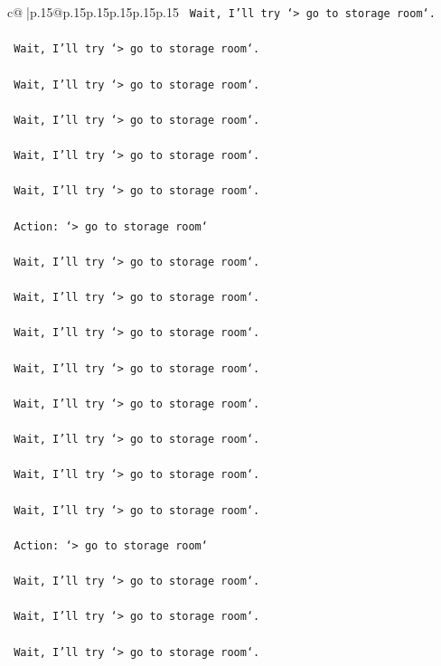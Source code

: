 \documentclass{article}
\begin{document}
{\begin{supertabular}{c@{$\;$}|p{.15\linewidth}@{}p{.15\linewidth}p{.15\linewidth}p{.15\linewidth}p{.15\linewidth}p{.15\linewidth}}
{{{\texttt{    Wait, I'll try `> go to storage room`.} \\
\\ 
\texttt{    Wait, I'll try `> go to storage room`.} \\
\\ 
\texttt{    Wait, I'll try `> go to storage room`.} \\
\\ 
\texttt{    Wait, I'll try `> go to storage room`.} \\
\\ 
\texttt{    Wait, I'll try `> go to storage room`.} \\
\\ 
\texttt{    Wait, I'll try `> go to storage room`.} \\
\\ 
\texttt{    Action: `> go to storage room`} \\
\\ 
\texttt{    Wait, I'll try `> go to storage room`.} \\
\\ 
\texttt{    Wait, I'll try `> go to storage room`.} \\
\\ 
\texttt{    Wait, I'll try `> go to storage room`.} \\
\\ 
\texttt{    Wait, I'll try `> go to storage room`.} \\
\\ 
\texttt{    Wait, I'll try `> go to storage room`.} \\
\\ 
\texttt{    Wait, I'll try `> go to storage room`.} \\
\\ 
\texttt{    Wait, I'll try `> go to storage room`.} \\
\\ 
\texttt{    Wait, I'll try `> go to storage room`.} \\
\\ 
\texttt{    Action: `> go to storage room`} \\
\\ 
\texttt{    Wait, I'll try `> go to storage room`.} \\
\\ 
\texttt{    Wait, I'll try `> go to storage room`.} \\
\\ 
\texttt{    Wait, I'll try `> go to storage room`.} \\
\\ 
}}}
\end{supertabular}}
\end{document}
